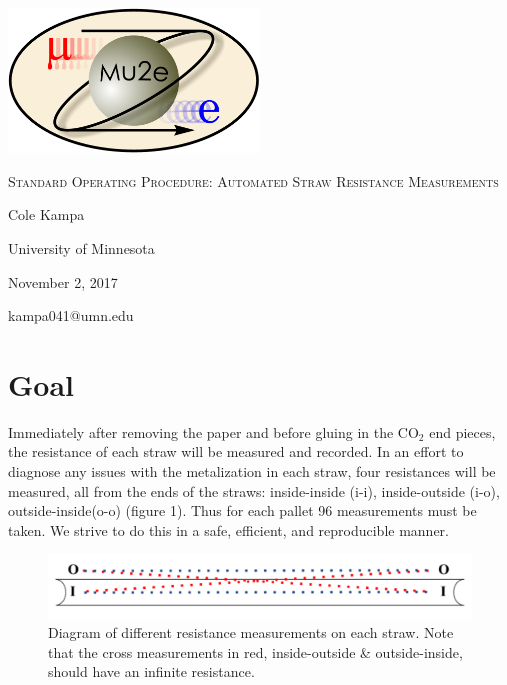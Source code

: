 \documentclass[letterpaper,12pt]{article}
\begin{document}
\begin{titlepage}
	\centering
	\includegraphics[width=0.5\textwidth]{mu2e_logo_oval.png}\par\vspace{2cm}
	{\scshape\LARGE Standard Operating Procedure: Automated Straw Resistance Measurements\par}
	\vspace{3cm}
	{\Large Cole Kampa\par}
	\vspace{3cm}
	{\large University of Minnesota\par}
 	\vspace{.5cm}
	{\large November 2, 2017\par}
	\vfill
	{kampa041@umn.edu\par}
\end{titlepage}

\clearpage
\setcounter{page}{2}


\section{Goal}
Immediately after removing the paper and before gluing in the CO$_{2}$ end pieces, the resistance of each straw will be measured and recorded. In an effort to diagnose any issues with the metalization in each straw, four resistances will be measured, all from the ends of the straws: inside-inside (i-i), inside-outside (i-o), outside-inside(o-o) (figure 1). Thus for each pallet 96 measurements must be taken. We strive to do this in a safe, efficient, and reproducible manner.

\begin{figure}[h]
	\centering
	\includegraphics[width=\textwidth]{straw_meas_2}
	\caption{Diagram of different resistance measurements on each straw. Note that the cross measurements in red, inside-outside \& outside-inside, should have an infinite resistance.}
\end{figure}
\end{document}
